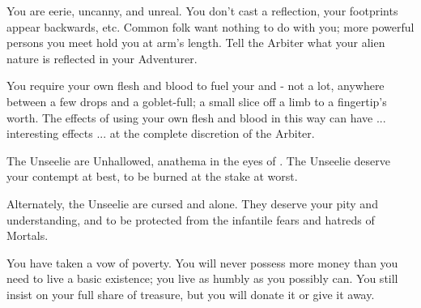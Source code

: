 \begin{multicols*}{2}

  You are eerie, uncanny, and unreal. You don't cast a reflection, your footprints appear backwards, etc. Common folk want nothing to do with you; more powerful persons you meet hold you at arm's length. Tell the Arbiter what your alien nature is reflected in your Adventurer.


  You require your own flesh and blood to fuel your  and  - not a lot, anywhere between a few drops and a goblet-full; a small slice off a limb to a fingertip's worth. The effects of using your own flesh and blood in this way can have ... interesting effects ... at the complete discretion of the Arbiter.


  The Unseelie are Unhallowed, anathema in the eyes of \TheAuthority. The Unseelie deserve your contempt at best, to be burned at the stake at worst.

  Alternately, the Unseelie are cursed and alone. They deserve your pity and understanding, and to be protected from the infantile fears and hatreds of Mortals.


  You have taken a vow of poverty. You will never possess more money than you need to live a basic existence; you live as humbly as you possibly can. You still insist on your full share of treasure, but you will donate it or give it away. 





\end{multicols*}
